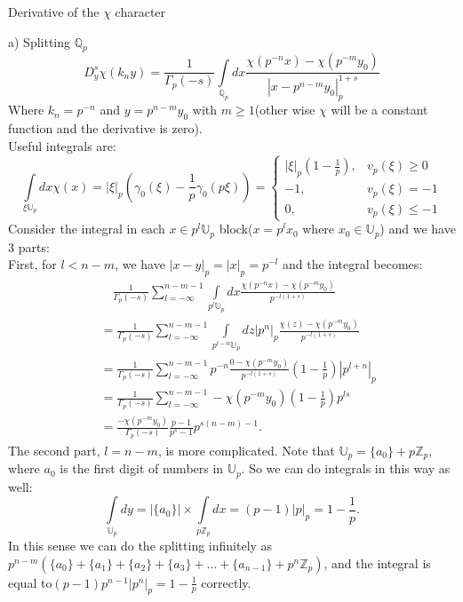 \documentclass[12pt]{article}
\begin{document}
\begin{section}{Derivative of the $\chi$ character}
\begin{paragraph}{a) Splitting $\mathbb{Q}_p$}
\begin{equation}
D^s_y \chi(k_n y)=\frac{1}{\Gamma_p (-s)} \int\limits _{\mathbb{Q}_p}dx \frac{\chi( p^{-n} x) - \chi( p^{-m}y_0)}{|x-p^{n-m}y_0|_p^{1+s}}
\end{equation}
Where $k_n=p^{-n}$ and $y=p^{n-m} y_0$ with $m\geq 1$(other wise $\chi$ will be a constant function and the derivative is zero).\\
Useful integrals are:
\begin{equation}
\int\limits_{\xi \mathbb{U}_p}dx\chi(x)=|\xi|_p(\gamma_0(\xi)-\frac{1}{p}\gamma_0(p\xi))
=\begin{cases}
|\xi|_p(1-\frac{1}{p}), &v_p(\xi)\geq 0\\
-1,  &v_p(\xi) = -1\\
0,  &v_p(\xi)\leq -1
\end{cases}
\end{equation}
Consider the integral in each $x\in p^l \mathbb{U}_p$ block($x=p^l x_0$ where $x_0\in \mathbb{U}_p$) and we have 3 parts:\\
First, for $l<n-m$, we have $|x-y|_p=|x|_p=p^{-l}$ and the integral becomes:
\begin{equation}
\begin{split}
&\quad\frac{1}{\Gamma_p(-s)}\sum_{l=-\infty}^{n-m-1} \int\limits _{p^l \mathbb{U}_p}dx \frac{\chi( p^{-n} x) - \chi( p^{-m}y_0)}{p^{-l(1+s)}}\\\
&= \frac{1}{\Gamma_p(-s)}\sum_{l=-\infty}^{n-m-1} \int\limits _{p^{l-n} \mathbb{U}_p}dz |p^n|_p \frac{\chi(z) - \chi( p^{-m}y_0)}{p^{-l(1+s)}} \\
&= \frac{1}{\Gamma_p(-s)}\sum_{l=-\infty}^{n-m-1} p^{-n} \frac{0 - \chi( p^{-m}y_0)}{p^{-l(1+s)}} (1-\frac{1}{p}) |p^{l+n}|_p \\
&= \frac{1}{\Gamma_p(-s)}\sum_{l=-\infty}^{n-m-1} - \chi( p^{-m}y_0)(1-\frac{1}{p})p^{ls}\\
&= \frac{- \chi( p^{-m}y_0)}{\Gamma_p(-s)} \frac{p-1}{p^s-1} p^{s(n-m)-1}.
\end{split}
\end{equation}
The second part, $l=n-m$, is more complicated. Note that $\mathbb{U}_p=\{a_0\}+p\mathbb{Z}_p$, where $a_0$ is the first digit of numbers in $\mathbb{U}_p$. So we can do integrals in this way as well: 
\begin{equation}
\int\limits_{\mathbb{U}_p}dy=|\{a_0\}|\times\int\limits_{p\mathbb{Z}_p}dx=(p-1)|p|_p=1-\frac{1}{p}.
\end{equation} 
In this sense we can do the splitting infinitely as $p^{n-m}(\{a_0\}+\{a_1\}+\{a_2\}+\{a_3\}+...+\{a_{n-1}\}+p^n\mathbb{Z}_p)$, and the integral is equal to$(p-1)p^{n-1}|p^n|_p=1-\frac{1}{p}$ correctly. \\

\end{paragraph}
\end{section}
\end{document}
